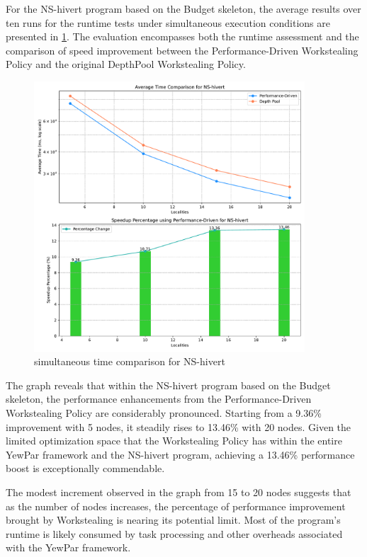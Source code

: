 \documentclass{mproj}
\begin{document}
For the NS-hivert program based on the Budget skeleton, the average results over ten runs for the runtime tests under simultaneous execution conditions are presented in \cref{fig:time_comparison_ns_simu}.
The evaluation encompasses both the runtime assessment and the comparison of speed improvement between the Performance-Driven Workstealing Policy and the original DepthPool Workstealing Policy.

\begin{figure}[h]
    \centering
    \includegraphics[width=0.9\textwidth]{images/time_comparison_ns_simultaneously.pdf}
    \caption{simultaneous time comparison for NS-hivert}
    \label{fig:time_comparison_ns_simu}
\end{figure}
\FloatBarrier

The graph reveals that within the NS-hivert program based on the Budget skeleton,
the performance enhancements from the Performance-Driven Workstealing Policy are considerably pronounced.
Starting from a 9.36\% improvement with 5 nodes, it steadily rises to 13.46\% with 20 nodes.
Given the limited optimization space that the Workstealing Policy has within the entire YewPar framework and the NS-hivert program,
achieving a 13.46\% performance boost is exceptionally commendable.

The modest increment observed in the graph from 15 to 20 nodes suggests that
as the number of nodes increases, the percentage of performance improvement brought by Workstealing is nearing its potential limit.
Most of the program's runtime is likely consumed by task processing and other overheads associated with the YewPar framework.
\end{document}
